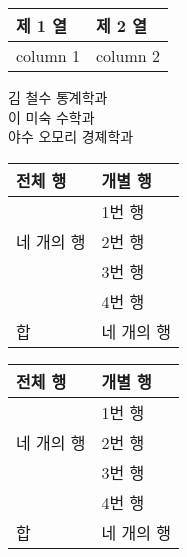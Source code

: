 \documentclass[11pt]{article}
\begin{document}
{
\tabcolsep=0in
\begin{tabular}{l|l}
제 1 열 & 제 2 열 \\ \hline
column 1 & column 2
\end{tabular}}

\begin{tabbing}
김 철수 \= 통계학과 \\
이 미숙 \> 수학과 \\
야수 오모리 \> 경졔학과
\end{tabbing}


\begin{tabular}{|l|l|} \hline
전체 행 & 개별 행 \\ \hline
\multirow{3}{*}{네 개의 행} & 1번 행 \\
& 2번 행 \\
& 3번 행 \\
& 4번 행 \\ \hline
합 & 네 개의 행 \\ \hline
\end{tabular}

\begin{tabular}{|l|l|} \hline
전체 행 & 개별 행 \\ \hline
\multirow{3}{*}[-8pt]{네 개의 행} & 1번 행 \\
& 2번 행 \\
& 3번 행 \\
& 4번 행 \\ \hline
합 & 네 개의 행 \\ \hline
\end{tabular}
\end{document}

